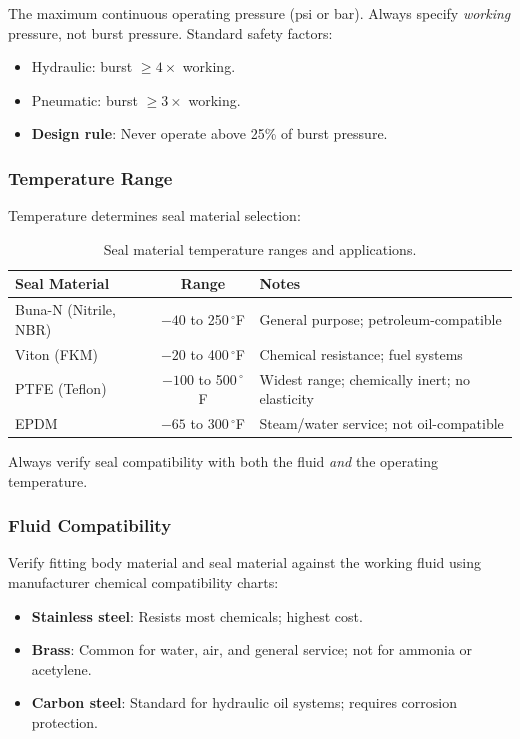 \documentclass[11pt,letterpaper,twoside,openany]{book}
\begin{document}
The maximum continuous operating pressure (psi or bar). Always specify \emph{working} pressure, not burst pressure. Standard safety factors:
\begin{itemize}[nosep,leftmargin=1.5em]
  \item Hydraulic: burst $\geq 4\times$ working.
  \item Pneumatic: burst $\geq 3\times$ working.
  \item \textbf{Design rule}: Never operate above 25\% of burst pressure.
\end{itemize}

\subsubsection{Temperature Range}

Temperature determines seal material selection:

\begin{table}[htbp]
\centering
\small
\begin{tabularx}{\textwidth}{l c X}
  \toprule
  \textbf{Seal Material} & \textbf{Range} & \textbf{Notes} \\
  \midrule
  Buna-N (Nitrile, NBR) & $-40$ to 250\,$^{\circ}$F & General purpose; petroleum-compatible \\
  Viton (FKM) & $-20$ to 400\,$^{\circ}$F & Chemical resistance; fuel systems \\
  PTFE (Teflon) & $-100$ to 500\,$^{\circ}$F & Widest range; chemically inert; no elasticity \\
  EPDM & $-65$ to 300\,$^{\circ}$F & Steam/water service; not oil-compatible \\
  \bottomrule
\end{tabularx}
\caption{Seal material temperature ranges and applications.}
\end{table}

Always verify seal compatibility with both the fluid \emph{and} the operating temperature.

\subsubsection{Fluid Compatibility}

Verify fitting body material and seal material against the working fluid using manufacturer chemical compatibility charts:
\begin{itemize}[nosep,leftmargin=1.5em]
  \item \textbf{Stainless steel}: Resists most chemicals; highest cost.
  \item \textbf{Brass}: Common for water, air, and general service; not for ammonia or acetylene.
  \item \textbf{Carbon steel}: Standard for hydraulic oil systems; requires corrosion protection.
\end{itemize}
\end{document}

